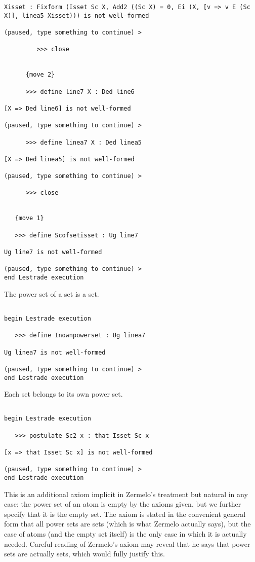 \documentclass[12pt]{article}
\begin{document}
\begin{verbatim}
Xisset : Fixform (Isset Sc X, Add2 ((Sc X) = 0, Ei (X, [v => v E (Sc X)], linea5 Xisset))) is not well-formed

(paused, type something to continue) >

         >>> close


      {move 2}

      >>> define line7 X : Ded line6

[X => Ded line6] is not well-formed

(paused, type something to continue) >

      >>> define linea7 X : Ded linea5

[X => Ded linea5] is not well-formed

(paused, type something to continue) >

      >>> close


   {move 1}

   >>> define Scofsetisset : Ug line7

Ug line7 is not well-formed

(paused, type something to continue) >
end Lestrade execution
\end{verbatim}

The power set of a set is a set.

\begin{verbatim}

begin Lestrade execution

   >>> define Inownpowerset : Ug linea7

Ug linea7 is not well-formed

(paused, type something to continue) >
end Lestrade execution
\end{verbatim}

Each set belongs to its own power set.

\begin{verbatim}

begin Lestrade execution

   >>> postulate Sc2 x : that Isset Sc x

[x => that Isset Sc x] is not well-formed

(paused, type something to continue) >
end Lestrade execution
\end{verbatim}

This is an additional axiom implicit in Zermelo's treatment but natural in any case:  the power set of an atom is empty by the axioms given, but we further
specify that it is the empty set.  The axiom is stated in the convenient general form that all power sets are sets (which is what Zermelo actually says), but the case of atoms (and the empty set itself)
is the only case in which it is actually needed.  Careful reading of Zermelo's axiom may reveal that he says that power sets are actually sets, which would fully justify this.
\end{document}
